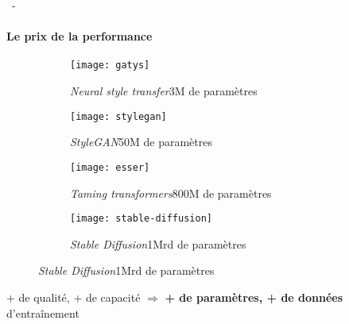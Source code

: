 \documentclass[aspectratio=169, 22pt]{beamer}
\begin{document}
\begin{frame}{\secname~- \subsecname}
  \framesubtitle{Le prix de la performance}
  \begin{figure}
    \begin{subfigure}[t]{0.24\linewidth}\centering
      \texttt{[image: gatys]}
      \caption{{\emph{Neural style transfer}\newline[Gatys et al., 2014]\newline 3M de paramètres}}
    \end{subfigure}
    \begin{subfigure}[t]{0.24\linewidth}\centering
      \texttt{[image: stylegan]}                
      \caption{{\emph{StyleGAN}\newline[Karras et al., 2019]\newline 50M de paramètres}}
    \end{subfigure}
    \begin{subfigure}[t]{0.24\linewidth}\centering
      \texttt{[image: esser]}                      
      \caption{\emph{Taming transformers}\newline[Esser et al., 2021]\newline 800M de paramètres}
    \end{subfigure}
    \begin{subfigure}[t]{0.24\linewidth}\centering
      \texttt{[image: stable-diffusion]}
      \caption{\emph{Stable Diffusion}\newline[Rombach et al., 2022]\newline 1Mrd de paramètres}
    \end{subfigure}
  \end{figure}
  \begin{exampleblock}{}
    \centering
    + de qualité, + de capacité $\Rightarrow$ \textbf{+ de \alert{paramètres}, + de \alert{données}}  d'entraînement
  \end{exampleblock}
\end{frame}
\end{document}
